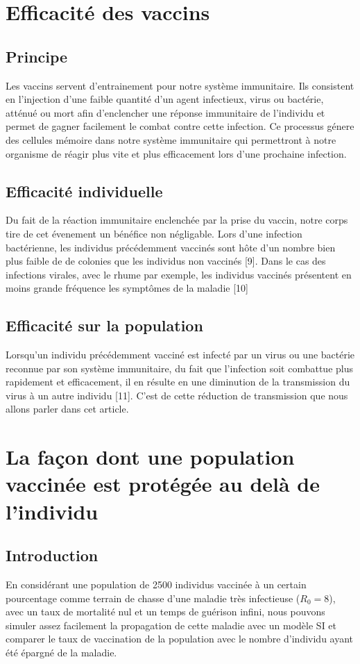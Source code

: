 \documentclass[10pt]{article}
\begin{document}
\section{Efficacité des vaccins}
\subsection{Principe}
Les vaccins servent d'entrainement pour notre système immunitaire. Ils consistent en l'injection d'une faible quantité d'un agent infectieux, virus ou bactérie, atténué ou mort afin d'enclencher une réponse immunitaire de l'individu et permet de gagner facilement le combat contre cette infection. Ce processus génere des cellules mémoire dans notre système immunitaire qui permettront à notre organisme de réagir plus vite et plus efficacement lors d'une prochaine infection.
\subsection{Efficacité individuelle}
Du fait de la réaction immunitaire enclenchée par la prise du vaccin, notre corps tire de cet évenement un bénéfice non négligable. Lors d'une infection bactérienne, les individus précédemment vaccinés sont hôte d'un nombre bien plus faible de de colonies que les individus non vaccinés [9]. Dans le cas des infections virales, avec le rhume par exemple, les individus vaccinés présentent en moins grande fréquence les symptômes de la maladie [10]
\subsection{Efficacité sur la population}
Lorsqu'un individu précédemment vacciné est infecté par un virus ou une bactérie reconnue par son système immunitaire, du fait que l'infection soit combattue plus rapidement et efficacement, il en résulte en une diminution de la transmission du virus à un autre individu [11]. C'est de cette réduction de transmission que nous allons parler dans cet article.

\section{La façon dont une population vaccinée est protégée au delà de l'individu}
\subsection{Introduction}
En considérant une population de 2500 individus vaccinée à un certain pourcentage comme terrain de chasse d'une maladie très infectieuse ($R_0=8$), avec un taux de mortalité nul et un temps de guérison infini, nous pouvons simuler assez facilement la propagation de cette maladie avec un modèle SI et comparer le taux de vaccination de la population avec le nombre d'individu ayant été épargné de la maladie.
\end{document}

